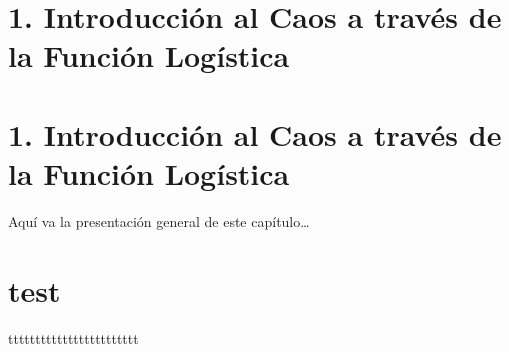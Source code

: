 \documentclass[
  11pt,
  a4paper,
  DIV=11,
  numbers=noendperiod]{scrreprt}
\begin{document}
\chapter{1. Introducción al Caos a través de la Función
Logística}\label{introducciuxf3n-al-caos-a-travuxe9s-de-la-funciuxf3n-loguxedstica}

\chapter{1. Introducción al Caos a través de la Función
Logística}\label{introducciuxf3n-al-caos-a-travuxe9s-de-la-funciuxf3n-loguxedstica-1}

Aquí va la presentación general de este capítulo\ldots{}

\chapter{test}\label{test}

tttttttttttttttttttttttt
\end{document}
